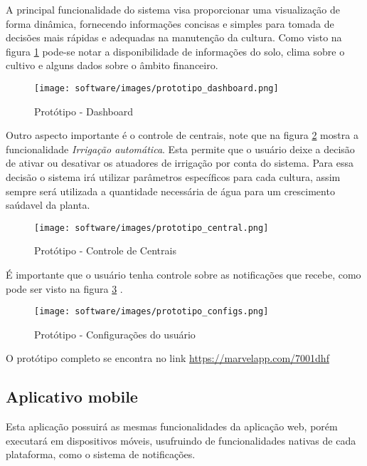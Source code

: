 	A principal funcionalidade do sistema visa proporcionar uma visualização de forma dinâmica, fornecendo 	informações concisas e simples para tomada de decisões mais rápidas e adequadas na manutenção da cultura. Como visto na figura \ref{fig:prototipodashboard} pode-se notar a disponibilidade de informações do solo, clima sobre o cultivo e alguns dados sobre o âmbito financeiro.

    \begin{figure}[H]
    	\centering
        \texttt{[image: software/images/prototipo\_dashboard.png]}
        \caption{Protótipo - Dashboard}
        \label{fig:prototipodashboard}
    \end{figure}


	Outro aspecto importante é o controle de centrais, note que na figura \ref{fig:prototipo_central} mostra a funcionalidade \textit{Irrigação automática}. Esta permite que o usuário deixe a decisão de ativar ou desativar os atuadores de irrigação por conta do sistema. Para essa decisão o sistema irá utilizar parâmetros específicos para cada cultura, assim sempre será utilizada a quantidade necessária de água para um crescimento saúdavel da planta. 

    \begin{figure}[H]
    	\centering
        \texttt{[image: software/images/prototipo\_central.png]}
        \caption{Protótipo - Controle de Centrais}
        \label{fig:prototipo_central}
    \end{figure}


É importante que o usuário tenha controle sobre as notificações que recebe, como pode ser visto na figura \ref{fig:prototipo_configs} .


    \begin{figure}[H]
    	\centering
        \texttt{[image: software/images/prototipo\_configs.png]}
        \caption{Protótipo - Configurações do usuário}
        \label{fig:prototipo_configs}
    \end{figure}


	O protótipo completo se encontra no link \url{https://marvelapp.com/7001dhf}


    \subsection{Aplicativo mobile}

    Esta aplicação possuirá as mesmas funcionalidades da aplicação web, porém executará em dispositivos móveis, usufruindo de funcionalidades nativas de cada plataforma, como o sistema de notificações.

